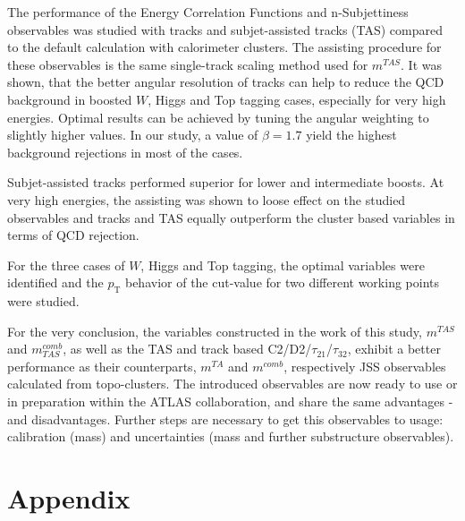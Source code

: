 \documentclass[UKenglish,texlive=2013]{\ATLASLATEXPATH atlasdoc}
\newcommand{\mta}{m^{TA}}
\newcommand{\mtas}{m^{TAS}}
\newcommand{\mcomb}{m^{comb}}
\newcommand{\mcombtas}{m^{comb}_{TAS}}
\begin{document}
The performance of the Energy Correlation Functions and n-Subjettiness observables was studied with tracks and subjet-assisted tracks (TAS) compared to the default calculation with calorimeter clusters. The assisting procedure for these observables is the same single-track scaling method used for $\mtas$. It was shown, that the better angular resolution of tracks can help to reduce the QCD background in boosted $W$, Higgs and Top tagging cases, especially for very high energies. Optimal results can be achieved by tuning the angular weighting to slightly higher values. In our study, a value of $\beta=1.7$ yield the highest background rejections in most of the cases. 

Subjet-assisted tracks performed superior for lower and intermediate boosts. At very high energies, the assisting was shown to loose effect on the studied observables and tracks and TAS equally outperform the cluster based variables in terms of QCD rejection.

For the three cases of $W$, Higgs and Top tagging, the optimal variables were identified and the $p_{\text{T}}$ behavior of the cut-value for two different working points were studied. 


For the very conclusion, the variables constructed in the work of this study, $\mtas$ and $\mcombtas$, as well as the TAS and track based C2/D2/$\tau_{21}$/$\tau_{32}$, exhibit a better performance as their counterparts, $\mta$ and $\mcomb$, respectively JSS observables calculated from topo-clusters. The introduced observables are now ready to use or in preparation within the ATLAS collaboration, and share the same advantages -and disadvantages. Further steps are necessary to get this observables to usage: calibration (mass) and uncertainties (mass and further substructure observables).

\clearpage
\appendix
\part*{Appendix}
\end{document}
